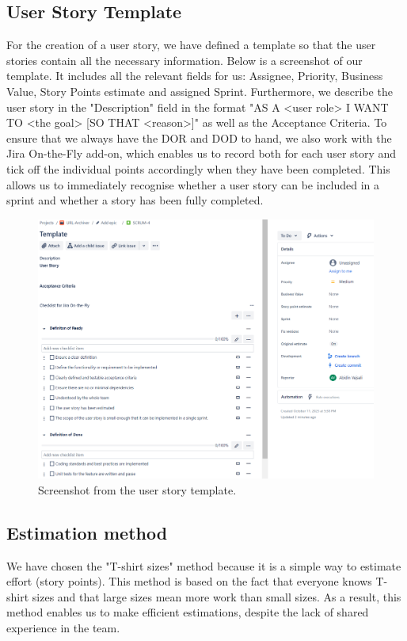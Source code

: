 \subsection{User Story Template}
For the creation of a user story, we have defined a template so that the user stories contain all the necessary information. Below is a screenshot of our template. It includes all the relevant fields for us: Assignee, Priority, Business Value, Story Points estimate and assigned Sprint. Furthermore, we describe the user story in the "Description" field in the format "AS A <user role> I WANT TO <the goal> [SO THAT <reason>]" as well as the Acceptance Criteria.
To ensure that we always have the DOR and DOD to hand, we also work with the Jira On-the-Fly add-on, which enables us to record both for each user story and tick off the individual points accordingly when they have been completed. This allows us to immediately recognise whether a user story can be included in a sprint and whether a story has been fully completed.
\begin{figure}[h!]
    \centering
    \includegraphics[width=1\textwidth]{pictures/Scrum/userstory_template}
    \caption{Screenshot from the user story template.}
    \label{fig:user_story_template}
\end{figure}
\clearpage

\subsection{Estimation method}
We have chosen the "T-shirt sizes" method because it is a simple way to estimate effort (story points). This method is based on the fact that everyone knows T-shirt sizes and that large sizes mean more work than small sizes. As a result, this method enables us to make efficient estimations, despite the lack of shared experience in the team.

